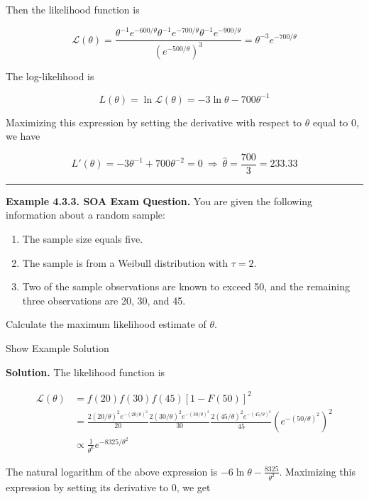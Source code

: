 \documentclass[]{book}
\providecommand{\tightlist}{%
  \setlength{\itemsep}{0pt}\setlength{\parskip}{0pt}}
\theoremstyle{definition}
\theoremstyle{definition}
\theoremstyle{definition}
\theoremstyle{remark}
\begin{document}
Then the likelihood function is

\[\mathcal{L}(\theta)= \frac{\theta^{-1} e^{-600/\theta} \theta^{-1} e^{-700/\theta} \theta^{-1} e^{-900/\theta}}{(e^{-500/\theta})^3} = \theta^{-3}e^{-700/\theta}\]

The log-likelihood is

\[L(\theta) = \ln\mathcal{L}(\theta) = -3\ln \theta - 700\theta^{-1}\]

Maximizing this expression by setting the derivative with respect to
\(\theta\) equal to 0, we have

\[L'(\theta) = -3\theta^{-1} + 700\theta^{-2} = 0 \ \Rightarrow \ \hat{\theta} = \frac{700}{3} = 233.33\]

\begin{center}\rule{0.5\linewidth}{\linethickness}\end{center}

\textbf{Example 4.3.3. SOA Exam Question.} You are given the following
information about a random sample:

\begin{enumerate}
\def\labelenumi{(\roman{enumi})}
\tightlist
\item
  The sample size equals five.
\item
  The sample is from a Weibull distribution with \(\tau=2\).
\item
  Two of the sample observations are known to exceed 50, and the
  remaining three observations are 20, 30, and 45.
\end{enumerate}

Calculate the maximum likelihood estimate of \(\theta\).

Show Example Solution

\hypertarget{toggleExampleSelect.3.3}{}
\textbf{Solution.} The likelihood function is

\[\begin{aligned} 
\mathcal{L}(\theta) &= f(20) f(30) f(45) [1-F(50)]^2 \\
&= \frac{2(20/\theta)^2 e^{-(20/\theta)^2}}{20} \frac{2(30/\theta)^2 e^{-(30/\theta)^2}}{30} \frac{2(45/\theta)^2 e^{-(45/\theta)^2}}{45}(e^{-(50/\theta)^2})^2 \\
&\propto \frac{1}{\theta^6} e^{-8325/\theta^2}
\end{aligned}\]

The natural logarithm of the above expression is
\(-6\ln\theta - \frac{8325}{\theta^2}\). Maximizing this expression by
setting its derivative to 0, we get
\end{document}
